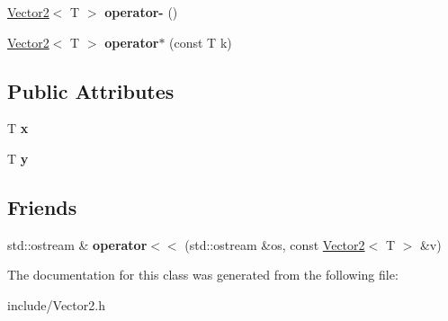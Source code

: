 \begin{DoxyCompactItemize}
\item 
\hypertarget{classsdl_1_1Vector2_a1912ba17728ee784f08936fbf3d4b653}{\hyperlink{classsdl_1_1Vector2}{Vector2}$<$ T $>$ {\bfseries operator-\/} ()}\label{classsdl_1_1Vector2_a1912ba17728ee784f08936fbf3d4b653}

\item 
\hypertarget{classsdl_1_1Vector2_af7e17c148141c8753eedc4e0d4bfa932}{\hyperlink{classsdl_1_1Vector2}{Vector2}$<$ T $>$ {\bfseries operator$\ast$} (const T k)}\label{classsdl_1_1Vector2_af7e17c148141c8753eedc4e0d4bfa932}

\end{DoxyCompactItemize}
\subsection*{Public Attributes}
\begin{DoxyCompactItemize}
\item 
\hypertarget{classsdl_1_1Vector2_a00cdf8a09328df444d5a77ec6f00e827}{T {\bfseries x}}\label{classsdl_1_1Vector2_a00cdf8a09328df444d5a77ec6f00e827}

\item 
\hypertarget{classsdl_1_1Vector2_a0840b109afb4c13614585567b48e2c31}{T {\bfseries y}}\label{classsdl_1_1Vector2_a0840b109afb4c13614585567b48e2c31}

\end{DoxyCompactItemize}
\subsection*{Friends}
\begin{DoxyCompactItemize}
\item 
\hypertarget{classsdl_1_1Vector2_aa89ba3c2ae7a53a25530d3eef6a3c4e3}{std\-::ostream \& {\bfseries operator$<$$<$} (std\-::ostream \&os, const \hyperlink{classsdl_1_1Vector2}{Vector2}$<$ T $>$ \&v)}\label{classsdl_1_1Vector2_aa89ba3c2ae7a53a25530d3eef6a3c4e3}

\end{DoxyCompactItemize}


The documentation for this class was generated from the following file\-:\begin{DoxyCompactItemize}
\item 
include/Vector2.\-h\end{DoxyCompactItemize}
